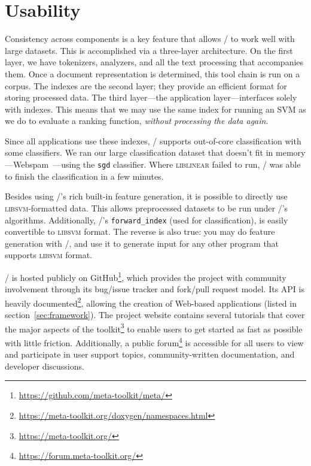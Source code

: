 \section{Usability}

Consistency across components is a key feature that allows \meta/ to work
well with large datasets. This is accomplished via a three-layer architecture.
On the first layer, we have tokenizers, analyzers, and all the text processing
that accompanies them. Once a document representation is determined, this tool
chain is run on a corpus. The indexes are the second layer; they provide an
efficient format for storing processed data. The third layer---the application
layer---interfaces solely with indexes. This means that we may use the same
index for running an SVM as we do to evaluate a ranking function, \emph{without
processing the data again}.

Since all applications use these indexes, \meta/ supports out-of-core
classification with some classifiers. We ran our large classification dataset
that doesn't fit in memory---Webspam~\citep{Webb:2006:CEAS}---using the
\texttt{sgd} classifier. Where \textsc{liblinear} failed to run, \meta/ was able
to finish the classification in a few minutes.

Besides using \meta/'s rich built-in feature generation, it is possible to
directly use \textsc{libsvm}-formatted data. This allows preprocessed datasets
to be run under \meta/'s algorithms. Additionally, \meta/'s
\texttt{forward\_index} (used for classification), is easily convertible to
\textsc{libsvm} format. The reverse is also true: you may do feature
generation with \meta/, and use it to generate input for any other program that
supports \textsc{libsvm} format.

\meta/ is hosted publicly on
GitHub\footnote{\url{https://github.com/meta-toolkit/meta/}}, which provides the
project with community involvement through its bug/issue tracker and fork/pull
request model. Its API is heavily
documented\footnote{\url{https://meta-toolkit.org/doxygen/namespaces.html}},
allowing the creation of Web-based applications (listed in
section~\ref{sec:framework}). The project website contains several tutorials
that cover the major aspects of the
toolkit\footnote{\url{https://meta-toolkit.org/}} to enable users to get started
as fast as possible with little friction. Additionally, a public
forum\footnote{\url{https://forum.meta-toolkit.org/}} is accessible for all
users to view and participate in user support topics, community-written
documentation, and developer discussions.

